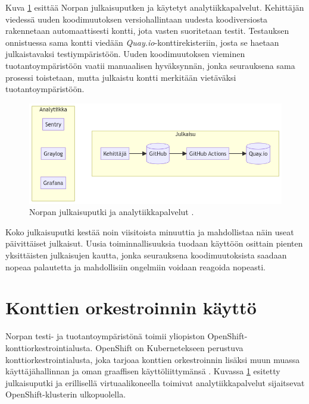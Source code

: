 Kuva \ref{fig:norppa:deployment} esittää Norpan julkaisuputken ja käytetyt analytiikkapalvelut.
Kehittäjän viedessä uuden koodimuutoksen versiohallintaan uudesta koodiversiosta rakennetaan automaattisesti kontti, jota vasten suoritetaan testit.
Testauksen onnistuessa sama kontti viedään \textit{Quay.io}-konttirekisteriin, josta se haetaan julkaistavaksi testiympäristöön.
Uuden koodimuutoksen vieminen tuotantoympäristöön vaatii manuaalisen hyväksynnän, jonka seurauksena sama prosessi toistetaan, mutta julkaistu kontti merkitään vietäväksi tuotantoympäristöön.

\begin{figure}[ht]
\begin{center}
\includegraphics[width=1\textwidth]{figures/norppa_deployment.png}
\caption{Norpan julkaisuputki ja analytiikkapalvelut \cite{Norppa23}\label{fig:norppa:deployment}.}
\end{center}
\end{figure}

Koko julkaisuputki kestää noin viisitoista minuuttia ja mahdollistaa näin useat päivittäiset julkaisut.
Uusia toiminnallisuuksia tuodaan käyttöön osittain pienten yksittäisten julkaisujen kautta, jonka seurauksena koodimuutoksista saadaan nopeaa palautetta ja mahdollisiin ongelmiin voidaan reagoida nopeasti.

\section{Konttien orkestroinnin käyttö}

Norpan testi- ja tuotantoympäristönä toimii yliopiston OpenShift-konttiorkestrointialusta.
OpenShift on Kubernetekseen perustuva konttiorkestrointialusta, joka tarjoaa konttien orkestroinnin lisäksi muun muassa käyttäjähallinnan ja oman graaffisen käyttöliittymänsä \cite{Lossent17}.
Kuvassa \ref{fig:norppa:deployment} esitetty julkaisuputki ja erillisellä virtuaalikoneella toimivat analytiikkapalvelut sijaitsevat OpenShift-klusterin ulkopuolella.

